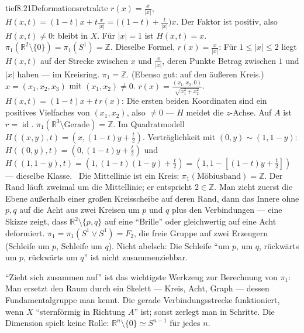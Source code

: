 \begin{loesungkarte}{tief}{8.21}{Deformationsretrakte}
$r(x) = \frac x{|x|}$, $H(x, t) = (1 - t)x + t\frac x{|x|} = \bigl((1 - t) + \frac t{|x|}\bigr)x$. Der Faktor ist positiv, also $H(x, t)\neq0$: bleibt in $X$. Für $|x| = 1$ ist $H(x, t) = x$. $\pi_1(\mathbb R^{2}\setminus\{0\}) = \pi_1(S^{1}) = \mathbb Z$.
Dieselbe Formel, $r(x) = \frac x{|x|}$: Für $1\le|x|\le2$ liegt $H(x, t)$ auf der Strecke zwischen $x$ und $\frac x{|x|}$, deren Punkte Betrag zwischen $1$ und $|x|$ haben --- im Kreisring. $\pi_1 = \mathbb Z$. (Ebenso gut: auf den äußeren Kreis.)
$x = (x_1, x_2, x_3)$ mit $(x_1, x_2)\neq0$. $r(x) = \frac{(x_1, x_2, 0)}{\sqrt{x_1^{2} + x_2^{2}}}$. $H(x, t) = (1 - t)x + t\,r(x)$: Die ersten beiden Koordinaten sind ein positives Vielfaches von $(x_1, x_2)$, also $\neq0$ --- $H$ meidet die $z$-Achse. Auf $A$ ist $r = \operatorname{id}$. $\pi_1(\mathbb R^{3}\setminus\text{Gerade}) = \mathbb Z$.
Im Quadratmodell $H((x, y), t) = (x, (1 - t)y + \frac t2)$. Verträglichkeit mit $(0, y)\sim(1, 1 - y)$: $H((0, y), t) = (0, (1 - t)y + \frac t2)$ und $H((1, 1 - y), t) = (1, (1 - t)(1 - y) + \frac t2) = (1, 1 - [(1 - t)y + \frac t2])$ --- dieselbe Klasse. \checkmark\ Die Mittellinie ist ein Kreis: $\pi_1(\text{Möbiusband}) = \mathbb Z$. Der Rand läuft zweimal um die Mittellinie; er entspricht $2\in\mathbb Z$.
Man zieht zuerst die Ebene außerhalb einer großen Kreisscheibe auf deren Rand, dann das Innere ohne $p, q$ auf die Acht aus zwei Kreisen um $p$ und $q$ plus den Verbindungen --- eine Skizze zeigt, dass $\mathbb R^{2}\setminus\{p, q\}$ auf eine \enquote{Brille} oder gleichwertig auf eine Acht deformiert. $\pi_1 = \pi_1(S^{1}\vee S^{1}) = F_2$, die freie Gruppe auf zwei Erzeugern (Schleife um $p$, Schleife um $q$). Nicht abelsch: Die Schleife \enquote{um $p$, um $q$, rückwärts um $p$, rückwärts um $q$} ist nicht zusammenziehbar.
\begin{mitnehmen}\kastentext
\enquote{Zieht sich zusammen auf} ist das wichtigste Werkzeug zur Berechnung von $\pi_1$: Man ersetzt den Raum durch ein Skelett --- Kreis, Acht, Graph --- dessen Fundamentalgruppe man kennt. Die gerade Verbindungsstrecke funktioniert, wenn $X$ \enquote{sternförmig in Richtung $A$} ist; sonst zerlegt man in Schritte. Die Dimension spielt keine Rolle: $\mathbb R^{n}\setminus\{0\}\simeq S^{n-1}$ für jedes $n$.
\end{mitnehmen}
\end{loesungkarte}


